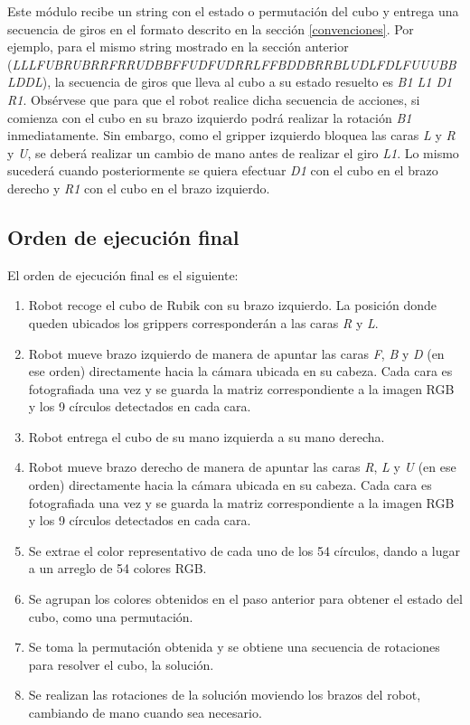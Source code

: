 Este módulo recibe un string con el estado o permutación del cubo y entrega una secuencia de giros en el formato descrito en la sección \ref{convenciones}. Por ejemplo, para el mismo string mostrado en la sección anterior (\textit{LLLFUBRUBRRFRRUDBBFFUDFUDRRLFFBDDBRRBLUDLFDLFUUUBBLDDL}), la secuencia de giros que lleva al cubo a su estado resuelto es \textit{B1 L1 D1 R1}. Obsérvese que para que el robot realice dicha secuencia de acciones, si comienza con el cubo en su brazo izquierdo podrá realizar la rotación \textit{B1} inmediatamente. Sin embargo, como el gripper izquierdo bloquea las caras \textit{L} y \textit{R} y \textit{U}, se deberá realizar un cambio de mano antes de realizar el giro \textit{L1}. Lo mismo sucederá cuando posteriormente se quiera efectuar \textit{D1} con el cubo en el brazo derecho y \textit{R1} con el cubo en el brazo izquierdo.


\subsection{Orden de ejecución final}
El orden de ejecución final es el siguiente:
\begin{enumerate}
	\item Robot recoge el cubo de Rubik con su brazo izquierdo. La posición donde queden ubicados los grippers corresponderán a las caras \textit{R} y \textit{L}.
	\item Robot mueve brazo izquierdo de manera de apuntar las caras \textit{F}, \textit{B} y \textit{D} (en ese orden) directamente hacia la cámara ubicada en su cabeza. Cada cara es fotografiada una vez y se guarda la matriz correspondiente a la imagen RGB y los 9 círculos detectados en cada cara.
	\item Robot entrega el cubo de su mano izquierda a su mano derecha.
	\item Robot mueve brazo derecho de manera de apuntar las caras \textit{R}, \textit{L} y \textit{U} (en ese orden) directamente hacia la cámara ubicada en su cabeza. Cada cara es fotografiada una vez y se guarda la matriz correspondiente a la imagen RGB y los 9 círculos detectados en cada cara.
	\item Se extrae el color representativo de cada uno de los 54 círculos, dando a lugar a un arreglo de 54 colores RGB.
	\item Se agrupan los colores obtenidos en el paso anterior para obtener el estado del cubo, como una permutación.
	\item Se toma la permutación obtenida y se obtiene una secuencia de rotaciones para resolver el cubo, la solución.
	\item Se realizan las rotaciones de la solución moviendo los brazos del robot, cambiando de mano cuando sea necesario.
\end{enumerate}
